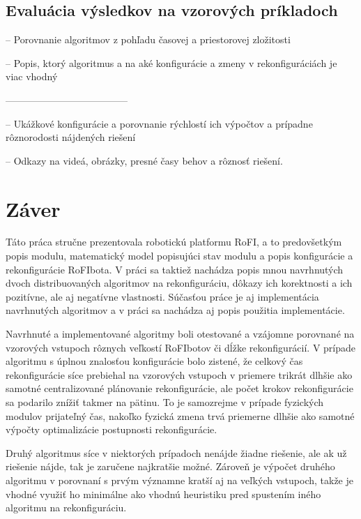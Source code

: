 \documentclass[
  digital, %
  oneside, %
  notable,   %
  lof,     %
  nolot,     %
]{fithesis3}
\begin{document}
\section{Evaluácia výsledkov na vzorových príkladoch}
-- Porovnanie algoritmov z pohľadu časovej a priestorovej zložitosti

-- Popis, ktorý algoritmus a na aké konfigurácie a zmeny v rekonfiguráciách je viac vhodný


--------------------------------------


-- Ukážkové konfigurácie a porovnanie rýchlostí ich výpočtov a prípadne rôznorodosti nájdených riešení

-- Odkazy na videá, obrázky, presné časy behov a rôznosť riešení. 






\chapter{Záver}
Táto práca stručne prezentovala robotickú platformu RoFI, a to predovšetkým popis modulu, matematický model popisujúci stav modulu a popis konfigurácie a rekonfigurácie RoFIbota. V práci sa taktiež nachádza popis mnou navrhnutých dvoch distribuovaných algoritmov na rekonfiguráciu, dôkazy ich korektnosti a ich pozitívne, ale aj negatívne vlastnosti. Súčasťou práce je aj implementácia navrhnutých algoritmov a v práci sa nachádza aj popis použitia implementácie. 

Navrhnuté a implementované algoritmy boli otestované a vzájomne porovnané na vzorových vstupoch rôznych veľkostí RoFIbotov či dĺžke rekonfigurácií. V prípade algoritmu s úplnou znalosťou konfigurácie bolo zistené, že celkový čas rekonfigurácie síce prebiehal na vzorových vstupoch v priemere trikrát dlhšie ako samotné centralizované plánovanie rekonfigurácie, ale počet krokov rekonfigurácie sa podarilo znížiť takmer na pätinu. To je samozrejme v prípade fyzických modulov prijateľný čas, nakoľko fyzická zmena trvá priemerne dlhšie ako samotné výpočty optimalizácie postupnosti rekonfigurácie. 

Druhý algoritmus síce v niektorých prípadoch nenájde žiadne riešenie, ale ak už riešenie nájde, tak je zaručene najkratšie možné. Zároveň je výpočet druhého algoritmu v porovnaní s prvým významne kratší aj na veľkých vstupoch, takže je vhodné využiť ho minimálne ako vhodnú heuristiku pred spustením iného algoritmu na rekonfiguráciu. 
\end{document}
